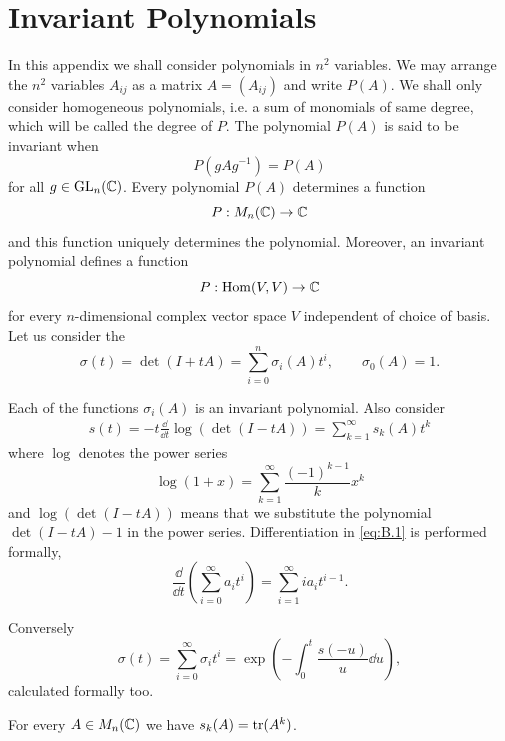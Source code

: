 \chapter{Invariant Polynomials}
In this appendix we shall consider polynomials in $n^2$ variables. We may arrange
the $n^2$ variables $A_{ij}$ as a matrix $A = (A_{ij})$ and write $P(A)$. We shall only consider
homogeneous polynomials, i.e. a sum of monomials of same degree, which will
be called the degree of $P$. The polynomial $P(A)$ is said to be invariant when
\[
  P(gAg^{-1}) = P(A)
\]
for all $g\in\mathrm{GL}_n({\mathbb{C}})$. Every polynomial $P(A)$ determines a function
\[
  P:M_n({\mathbb{C}})\to {\ensuremath{\mathbb{C}}}
\]
and this function uniquely determines the polynomial. Moreover, an invariant
polynomial defines a function
\[
  P:\operatorname{Hom}(V, V)\to{\ensuremath{\mathbb{C}}}
\]
for every $n$-dimensional complex vector space $V$ independent of choice of basis.
Let us consider the 
\[
  \sigma(t) = \det(I+tA) = \sum_{i=0}^n \sigma_i(A)t^i, \qquad \sigma_0(A) = 1.
\]

Each of the functions $\sigma_i(A)$ is an invariant polynomial. Also consider
\begin{align}\label{eq:B.1}
  s(t) = -t\frac{\dd }{\dd t}\log(\det(I-tA))
    = \sum_{k=1}^{\infty}{s_k(A)t^k}
\end{align}
where $\log$ denotes the power series
\[
  \log(1+x) = \sum_{k=1}^{\infty}\frac{(-1)^{k-1}}{k}x^k
\]
and $\log(\det(I - tA))$ means that we substitute the polynomial $\det(I-tA)-1$ in the
power series. Differentiation in \eqref{eq:B.1} is performed formally,
\[
  \frac{\dd }{\dd t}\left(\sum_{i=0}^{\infty }{a_it^i}\right)
  = \sum_{i=1}^{\infty }{ia_it^{i-1}}.
\]

Conversely
\[
  \sigma(t) = \sum_{i=0}^{\infty}\sigma_it^i = \exp\left(-\int_0^t \frac{s(-u)}{u}\dd u\right),
\]
calculated formally too.

\begin{lemma}\label{lemma:B.1}
  For every $A\in M_n({\mathbb{C}})$ we have $s_k(A)=\mathrm{tr}(A^k)$.
\end{lemma}

